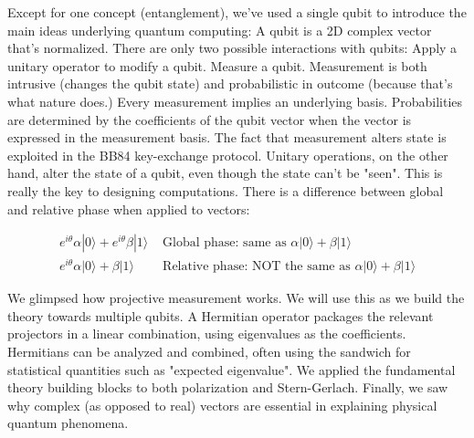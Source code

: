 \documentclass[main.tex]{subfiles}
\begin{document}
    Except for one concept (entanglement), we've used a single qubit to introduce the main ideas underlying quantum computing: A qubit is a 2D complex vector that's normalized. There are only two possible interactions with qubits: Apply a unitary operator to modify a qubit. Measure a qubit. Measurement is both intrusive (changes the qubit state) and probabilistic in outcome (because that's what nature does.) Every measurement implies an underlying basis. Probabilities are determined by the coefficients of the qubit vector when the vector is expressed in the measurement basis. The fact that measurement alters state is exploited in the BB84 key-exchange protocol. Unitary operations, on the other hand, alter the state of a qubit, even though the state can't be "seen". This is really the key to designing computations. There is a difference between global and relative phase when applied to vectors:
    
    $$
    \begin{array}{ll}
    e^{i \theta} \alpha|0\rangle+e^{i \theta} \beta|1\rangle & \text { Global phase: same as } \alpha|0\rangle+\beta|1\rangle \\
    e^{i \theta} \alpha|0\rangle+\beta|1\rangle & \text { Relative phase: NOT the same as } \alpha|0\rangle+\beta|1\rangle
    \end{array}
    $$
    
    We glimpsed how projective measurement works. We will use this as we build the theory towards multiple qubits. A Hermitian operator packages the relevant projectors in a linear combination, using eigenvalues as the coefficients. Hermitians can be analyzed and combined, often using the sandwich for statistical quantities such as "expected eigenvalue". We applied the fundamental theory building blocks to both polarization and Stern-Gerlach. Finally, we saw why complex (as opposed to real) vectors are essential in explaining physical quantum phenomena.
\end{document}
